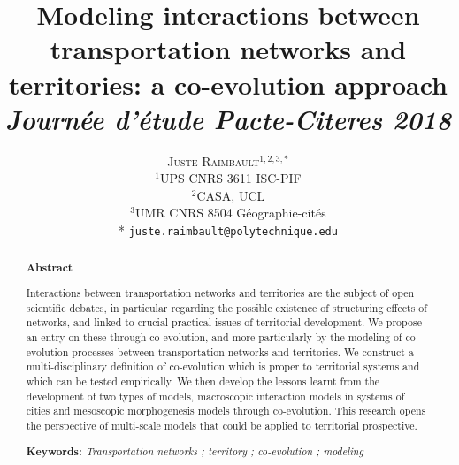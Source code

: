\documentclass[11pt]{article}
\newcommand{\noun}[1]{\textsc{#1}}
\begin{document}
\title{
Modeling interactions between transportation networks and territories: a co-evolution approach
\bigskip\\
\textit{Journée d'étude Pacte-Citeres 2018\\
}
}
\author{\noun{Juste Raimbault}$^{1,2,3,*}$\medskip\\
$^1$UPS CNRS 3611 ISC-PIF\\
$^2$CASA, UCL\\
$^3$UMR CNRS 8504 Géographie-cités\medskip\\
* \texttt{juste.raimbault@polytechnique.edu}
}
\date{}

\maketitle

\justify





\medskip


\renewcommand{\abstractname}{}
\begin{abstract}
	\begin{center}
	\textbf{Abstract}
	\end{center}
	
	\medskip
	
	Interactions between transportation networks and territories are the subject of open scientific debates, in particular regarding the possible existence of structuring effects of networks, and linked to crucial practical issues of territorial development. We propose an entry on these through co-evolution, and more particularly by the modeling of co-evolution processes between transportation networks and territories. We construct a multi-disciplinary definition of co-evolution which is proper to territorial systems and which can be tested empirically. We then develop the lessons learnt from the development of two types of models, macroscopic interaction models in systems of cities and mesoscopic morphogenesis models through co-evolution. This research opens the perspective of multi-scale models that could be applied to territorial prospective.
	
	\medskip
	
	\textbf{Keywords: }\textit{Transportation networks ; territory ; co-evolution ; modeling}
	
\end{abstract}



\end{document}
